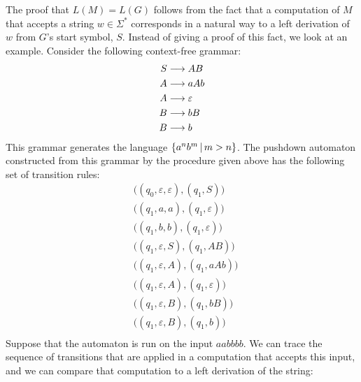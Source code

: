 The proof that $L(M)=L(G)$ follows from the fact that
a computation of $M$ that accepts a string $w\in\Sigma^*$ corresponds in
a natural way to a left derivation of $w$ from $G$'s start symbol, $S$.
Instead of giving a proof of this fact, we look at an example.
Consider the following context-free grammar:
\begin{align*}
  S&\longrightarrow AB\\
  A&\longrightarrow aAb\\
  A&\longrightarrow \varepsilon\\
  B&\longrightarrow bB\\
  B&\longrightarrow b
\end{align*}
This grammar generates the language $\{a^nb^m\,|\, m > n\}$.  The pushdown
automaton constructed from this grammar by the procedure given above has
the following set of transition rules:
\begin{align*}
  &\big((q_0,\varepsilon,\varepsilon),(q_1,S)\big)\\
  &\big((q_1,a,a),(q_1,\varepsilon)\big)\\
  &\big((q_1,b,b),(q_1,\varepsilon)\big)\\
  &\big((q_1,\varepsilon,S),(q_1,AB)\big)\\
  &\big((q_1,\varepsilon,A),(q_1,aAb)\big)\\
  &\big((q_1,\varepsilon,A),(q_1,\varepsilon)\big)\\
  &\big((q_1,\varepsilon,B),(q_1,bB)\big)\\
  &\big((q_1,\varepsilon,B),(q_1,b)\big)\\
\end{align*}
Suppose that the automaton is run on the input $aabbbb$.  We can trace the
sequence of transitions that are applied in a computation that accepts this
input, and we can compare that computation to a left derivation of the
string:

